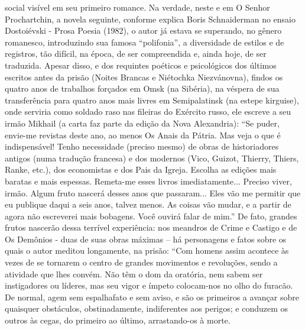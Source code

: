 social visível em seu primeiro romance. Na verdade, neste e em O Senhor
Prochartchin, a novela seguinte, conforme explica Boris Schnaiderman no
ensaio Dostoiévski - Prosa Poesia (1982), o autor já estava se
superando, no gênero romanesco, introduzindo sua famosa ``polifonia'', a
diversidade de estilos e de registros, tão difícil, na época, de ser
compreendida e, ainda hoje, de ser traduzida. Apesar disso, e dos
requintes poéticos e psicológicos dos últimos escritos antes da prisão
(Noites Brancas e Niétochka Niezvánovna), findos os quatro anos de
trabalhos forçados em Omsk (na Sibéria), na véspera de sua transferência
para quatro anos mais livres em Semipalatinsk (na estepe kirguise), onde
serviria como soldado raso nas fileiras do Exército russo, ele escreve a
seu irmão Mikhail (a carta faz parte da edição da Nova Alexandria): ``Se
puder, envie-me revistas deste ano, ao menos Os Anais da Pátria. Mas
veja o que é indispensável! Tenho necessidade (preciso mesmo) de obras
de historiadores antigos (numa tradução francesa) e dos modernos (Vico,
Guizot, Thierry, Thiers, Ranke, etc.), dos economistas e dos Pais da
Igreja. Escolha as edições mais baratas e mais espessas. Remeta-me esses
livros imediatamente... Preciso viver, irmão. Algum fruto nascerá desses
anos que passaram... Eles vão me permitir que eu publique daqui a seis
anos, talvez menos. As coisas vão mudar, e a partir de agora não
escreverei mais bobagens. Você ouvirá falar de mim.'' De fato, grandes
frutos nascerão dessa terrível experiência: nos meandros de Crime e
Castigo e de Os Demônios - duas de suas obras máximas -- há personagens
e fatos sobre os quais o autor meditou longamente, na prisão: ``Com
homens assim acontece às vezes de se tornarem o centro de grandes
movimentos e revoluções, sendo a atividade que lhes convém. Não têm o
dom da oratória, nem sabem ser instigadores ou líderes, mas seu vigor e
ímpeto colocam-nos no olho do furacão. De normal, agem sem espalhafato e
sem aviso, e são os primeiros a avançar sobre quaisquer obstáculos,
obstinadamente, indiferentes aos perigos; e conduzem os outros às cegas,
do primeiro ao último, arrastando-os à morte.

